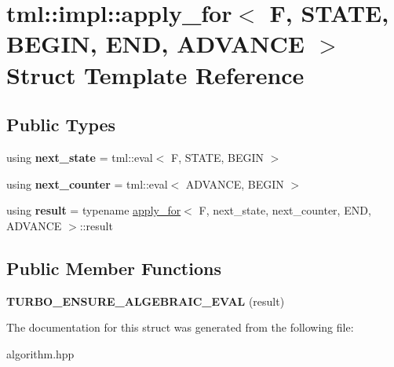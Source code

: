 \hypertarget{structtml_1_1impl_1_1apply__for}{\section{tml\+:\+:impl\+:\+:apply\+\_\+for$<$ F, S\+T\+A\+T\+E, B\+E\+G\+I\+N, E\+N\+D, A\+D\+V\+A\+N\+C\+E $>$ Struct Template Reference}
\label{structtml_1_1impl_1_1apply__for}
}
\subsection*{Public Types}
\begin{DoxyCompactItemize}
\item 
\hypertarget{structtml_1_1impl_1_1apply__for_adfb6f68ff76b5798d17b383835902fa6}{using {\bfseries next\+\_\+state} = tml\+::eval$<$ F, S\+T\+A\+T\+E, B\+E\+G\+I\+N $>$}\label{structtml_1_1impl_1_1apply__for_adfb6f68ff76b5798d17b383835902fa6}

\item 
\hypertarget{structtml_1_1impl_1_1apply__for_a70e9ccf315dcffc699ebb5174880ff13}{using {\bfseries next\+\_\+counter} = tml\+::eval$<$ A\+D\+V\+A\+N\+C\+E, B\+E\+G\+I\+N $>$}\label{structtml_1_1impl_1_1apply__for_a70e9ccf315dcffc699ebb5174880ff13}

\item 
\hypertarget{structtml_1_1impl_1_1apply__for_ad8f0df544935814f6fcf88560e4b722f}{using {\bfseries result} = typename \hyperlink{structtml_1_1impl_1_1apply__for}{apply\+\_\+for}$<$ F, next\+\_\+state, next\+\_\+counter, E\+N\+D, A\+D\+V\+A\+N\+C\+E $>$\+::result}\label{structtml_1_1impl_1_1apply__for_ad8f0df544935814f6fcf88560e4b722f}

\end{DoxyCompactItemize}
\subsection*{Public Member Functions}
\begin{DoxyCompactItemize}
\item 
\hypertarget{structtml_1_1impl_1_1apply__for_ae2707e76fce5486177b57b7bf7e08a37}{{\bfseries T\+U\+R\+B\+O\+\_\+\+E\+N\+S\+U\+R\+E\+\_\+\+A\+L\+G\+E\+B\+R\+A\+I\+C\+\_\+\+E\+V\+A\+L} (result)}\label{structtml_1_1impl_1_1apply__for_ae2707e76fce5486177b57b7bf7e08a37}

\end{DoxyCompactItemize}


The documentation for this struct was generated from the following file\+:\begin{DoxyCompactItemize}
\item 
algorithm.\+hpp\end{DoxyCompactItemize}
